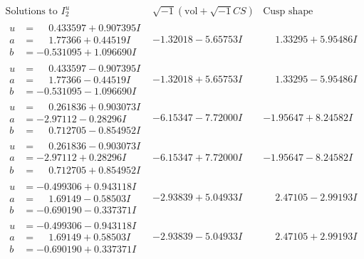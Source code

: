 \documentclass[1p]{elsarticle_modified}
\theoremstyle{definition}
\newcommand{\I}{\sqrt{-1}}
\begin{document}
$$\begin{array}{c|c|c}  
\text{Solutions to }I^u_{2}& \I (\text{vol} + \sqrt{-1}CS) & \text{Cusp shape}\\
 \hline 
\begin{aligned}
u &= \phantom{-}0.433597 + 0.907395 I \\
a &= \phantom{-}1.77366 + 0.44519 I \\
b &= -0.531095 + 1.096690 I\end{aligned}
 & -1.32018 - 5.65753 I & \phantom{-}1.33295 + 5.95486 I \\ \hline\begin{aligned}
u &= \phantom{-}0.433597 - 0.907395 I \\
a &= \phantom{-}1.77366 - 0.44519 I \\
b &= -0.531095 - 1.096690 I\end{aligned}
 & -1.32018 + 5.65753 I & \phantom{-}1.33295 - 5.95486 I \\ \hline\begin{aligned}
u &= \phantom{-}0.261836 + 0.903073 I \\
a &= -2.97112 - 0.28296 I \\
b &= \phantom{-}0.712705 - 0.854952 I\end{aligned}
 & -6.15347 - 7.72000 I & -1.95647 + 8.24582 I \\ \hline\begin{aligned}
u &= \phantom{-}0.261836 - 0.903073 I \\
a &= -2.97112 + 0.28296 I \\
b &= \phantom{-}0.712705 + 0.854952 I\end{aligned}
 & -6.15347 + 7.72000 I & -1.95647 - 8.24582 I \\ \hline\begin{aligned}
u &= -0.499306 + 0.943118 I \\
a &= \phantom{-}1.69149 - 0.58503 I \\
b &= -0.690190 - 0.337371 I\end{aligned}
 & -2.93839 + 5.04933 I & \phantom{-}2.47105 - 2.99193 I \\ \hline\begin{aligned}
u &= -0.499306 - 0.943118 I \\
a &= \phantom{-}1.69149 + 0.58503 I \\
b &= -0.690190 + 0.337371 I\end{aligned}
 & -2.93839 - 5.04933 I & \phantom{-}2.47105 + 2.99193 I \\ \hline\begin{aligned}

\end{aligned}
\end{array}$$
\end{document}
